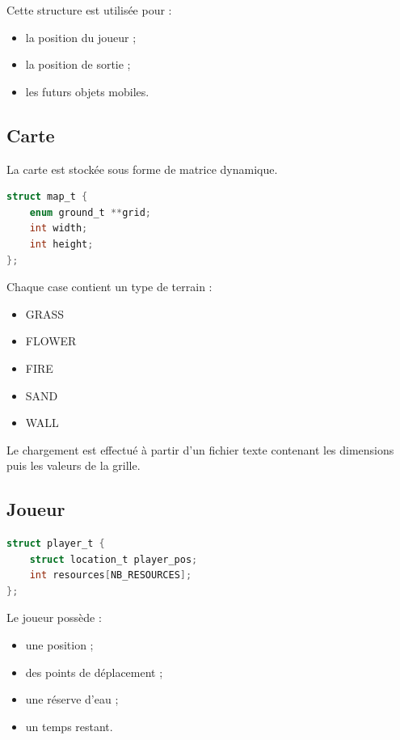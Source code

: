 \documentclass[a4paper,11pt]{article}
\begin{document}
Cette structure est utilisée pour :

\begin{itemize}
    \item la position du joueur ;
    \item la position de sortie ;
    \item les futurs objets mobiles.
\end{itemize}

\subsection{Carte}

La carte est stockée sous forme de matrice dynamique.

\begin{lstlisting}[language=C]
struct map_t {
    enum ground_t **grid;
    int width;
    int height;
};
\end{lstlisting}

Chaque case contient un type de terrain :

\begin{itemize}
    \item GRASS
    \item FLOWER
    \item FIRE
    \item SAND
    \item WALL
\end{itemize}

Le chargement est effectué à partir d'un fichier texte contenant les dimensions puis les valeurs de la grille.

\subsection{Joueur}

\begin{lstlisting}[language=C]
struct player_t {
    struct location_t player_pos;
    int resources[NB_RESOURCES];
};
\end{lstlisting}

Le joueur possède :

\begin{itemize}
    \item une position ;
    \item des points de déplacement ;
    \item une réserve d'eau ;
    \item un temps restant.
\end{itemize}
\end{document}
